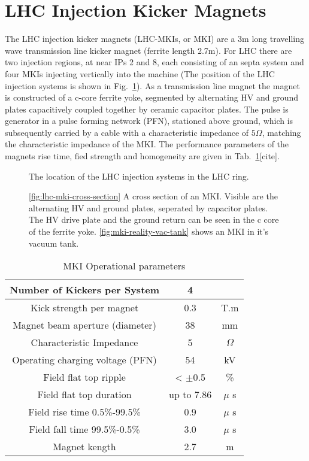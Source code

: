 \section{LHC Injection Kicker Magnets}

The LHC injection kicker magnets (LHC-MKIs, or MKI) are a 3m long travelling wave transmission line kicker magnet (ferrite length 2.7m). For LHC there are two injection regions, at near IPs 2 and 8, each consisting of an septa system and four MKIs injecting vertically into the machine (The position of the LHC injection systems is shown in Fig.~\ref{fig:lhc-injection-systems}). As a transmission line magnet the magnet is constructed of a c-core ferrite yoke, segmented by alternating HV and ground plates capacitively coupled together by ceramic capacitor plates. The pulse is generator in a pulse forming network (PFN), stationed above ground, which is subsequently carried by a cable with a characteristic impedance of $5 \Omega$, matching the characteristic impedance of the MKI. The performance parameters of the magnets rise time, fied strength and homogeneity are given in Tab.~\ref{tab:mki-parameters}[cite].

\begin{figure}
\label{fig:lhc-injection-systems}
\caption{The location of the LHC injection systems in the LHC ring.}
\end{figure}


\begin{figure}
\subfigure[]{
\label{fig:lhc-mki-cross-section}
}
\subfigure[]{
\label{fig:mki-reality-vac-tank}
}
\caption{\ref{fig:lhc-mki-cross-section} A cross section of an MKI. Visible are the alternating HV and ground plates, seperated by capacitor plates. The HV drive plate and the ground return can be seen in the c core of the ferrite yoke. \ref{fig:mki-reality-vac-tank} shows an MKI in it's vacuum tank.}
\end{figure}

\begin{table}
\caption{MKI Operational parameters}

\begin{center}
\begin{tabular}{c | c | c}
Number of Kickers per System & 4 & \\ \hline
Kick strength per magnet & 0.3 & T.m \\ \hline
Magnet beam aperture (diameter) & 38 & mm \\ \hline
Characteristic Impedance & 5 & $\Omega$ \\ \hline
Operating charging voltage (PFN) & 54 & kV \\ \hline
Field flat top ripple & < $\pm$0.5 & \% \\ \hline
Field flat top duration & up to 7.86 & $\mu$ s \\ \hline
Field rise time 0.5\%-99.5\% & 0.9 & $\mu$ s \\ \hline
Field fall time 99.5\%-0.5\% & 3.0 & $\mu$ s \\ \hline
Magnet kength & 2.7 & m \\ 
\end{tabular}
\end{center}
\label{tab:mki-parameters}
\end{table}
